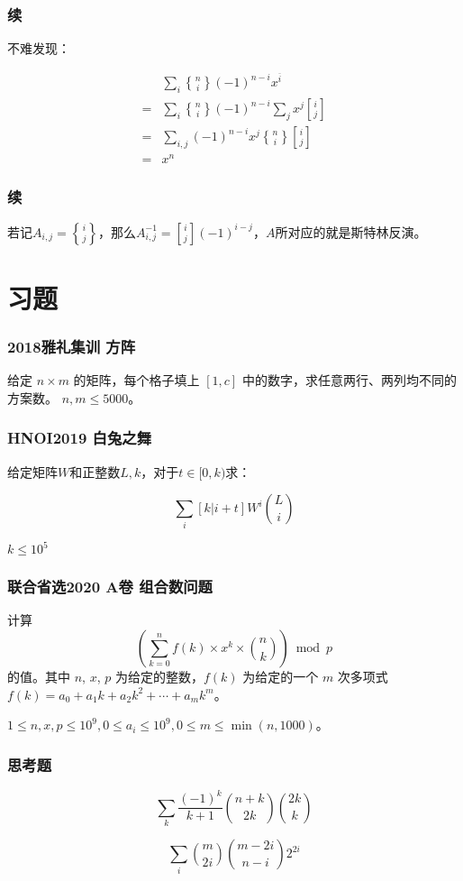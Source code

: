 \documentclass[10pt]{beamer}
\begin{document}
	\begin{frame}
		\frametitle{续}
	
		不难发现：

		$$
		\begin{aligned}
		&\sum_i {n\brace i}(-1)^{n-i}x^{\overline{i}}\\
		=&\sum_i {n\brace i}(-1)^{n-i}\sum_j x^j{i\brack j}\\
		=&\sum_{i,j} (-1)^{n-i}x^j{n\brace i}{i\brack j}\\
		=&x^n
		\end{aligned}
		$$
	
	\end{frame}
	\begin{frame}
		\frametitle{续}
	
		若记$A_{i,j}={i\brace j}$，那么$A_{i,j}^{-1}={i\brack j}(-1)^{i-j}$，$A$所对应的就是斯特林反演。
	
	\end{frame}
	\section{习题}
	\begin{frame}
		\frametitle{2018雅礼集训 方阵}
	
		给定 $n \times m$ 的矩阵，每个格子填上 $[1, c]$ 中的数字，求任意两行、两列均不同的方案数。
		$n, m \le 5000$。
	
	\end{frame}
	\begin{frame}
		\frametitle{HNOI2019 白兔之舞}
	
		给定矩阵$W$和正整数$L,k$，对于$t\in[0,k)$求：

		$$
		\sum_{i}[k|i+t]W^i{L\choose i}
		$$

		$k\le 10^5$
	
	\end{frame}
	\begin{frame}
		\frametitle{联合省选2020 A卷 组合数问题}
	
		计算 
		$$\left(\sum_{k=0}^{n}f(k)\times x^k\times \binom{n}{k}\right)\bmod p$$ 
		的值。其中 $n$, $x$, $p$ 为给定的整数，$f(k)$ 为给定的一个 $m$ 次多项式 $f(k) = a_0 + a_1k + a_2k^2 + \cdots + a_mk^m$。

		$1\le n, x, p \le 10^9, 0\le a_i\le 10^9, 0\le m \le \min(n,1000)$。
	\end{frame}
	\begin{frame}
		\frametitle{思考题}
	
		$$
		\sum_{k}\dfrac{(-1)^k}{k+1}{n+k\choose 2k}{2k\choose k}
		$$
	
		$$
		\sum_i {m\choose 2i}{m-2i\choose n-i}2^{2i}
		$$
	
	\end{frame}
\end{document}
